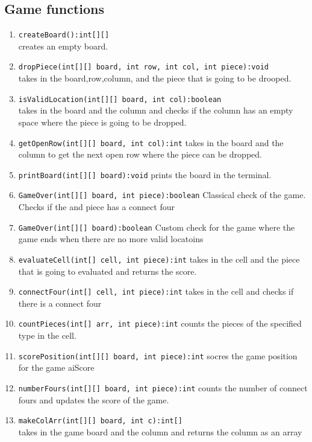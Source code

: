 \documentclass{article}
\begin{document}
\subsection{Game functions}
\begin{enumerate}
    \item {\small\verb"createBoard():int[][]"}\\ creates an empty board.
    \item {\small\verb"dropPiece(int[][] board, int row, int col, int piece):void"} \\takes in the board,row,column, and the piece that is going to be drooped.
    \item {\small\verb"isValidLocation(int[][] board, int col):boolean"}\\takes in the board and the column and checks if the column has an empty space where the piece is going to be dropped.
    \item {\small\verb"getOpenRow(int[][] board, int col):int"} takes in the board and the column to get the next open row where the piece can be dropped.
    \item {\small\verb"printBoard(int[][] board):void"} prints the board in the terminal.
    \item {\small\verb"GameOver(int[][] board, int piece):boolean"} Classical check of the game. Checks if the and piece has a connect four
    \item {\small\verb"GameOver(int[][] board):boolean"} Custom check for the game where the game ends when there are no more valid locatoins
    \item {\small\verb"evaluateCell(int[] cell, int piece):int"} takes in the cell and the piece that is going to evaluated and returns the score.
    \item {\small\verb"connectFour(int[] cell, int piece):int"} takes in the cell and checks if there is a connect four
    \item {\small\verb"countPieces(int[] arr, int piece):int"} counts the pieces of the specified type in the cell.
    \item {\small\verb"scorePosition(int[][] board, int piece):int"} socres the game position for the game aiScore
    \item \verb"numberFours(int[][] board, int piece):int" counts the number of connect fours and updates the score of the game.
    \item {\small\verb"makeColArr(int[][] board, int c):int[]"} \\takes in the game board and the column and returns the column as an array

\end{enumerate}
\end{document}
